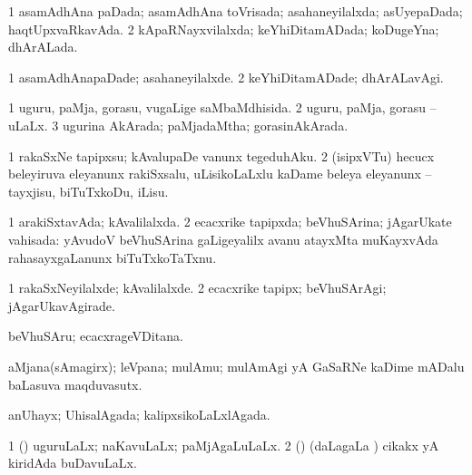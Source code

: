 \bentry
{} 
\gl{\gu}
\expl{}
\bmng
\bnum
\num{1} asamAdhAna paDada; asamAdhAna toVrisada; asahaneyilalxda; asUyepaDada; haqtUpxvaRkavAda. 
\num{2} kApaRNayxvilalxda; keYhiDitamADada; koDugeYna; dhArALada. 
\enum
\emng
\eentry

\bentry
{} 
\gl{\kirxvi}
\expl{}
\bmng
\bnum
\num{1} asamAdhAnapaDade; asahaneyilalxde. 
\num{2} keYhiDitamADade; dhArALavAgi. 
\enum
\emng
\eentry

\bentry
{} 
\gl{\gu}
\bmng
\bnum
\num{1} uguru, paMja, gorasu, \mo vugaLige saMbaMdhisida. 
\num{2} uguru, paMja, gorasu -- uLaLx. 
\num{3} ugurina AkArada; paMjadaMtha; gorasinAkArada. 
\enum
\emng
\eentry

\bentry
{} 
\gl{\sakirx}
\expl{}
\bmng
\bnum
\num{1} rakaSxNe tapipxsu; kAvalupaDe \mo vanunx tegeduhAku. 
\num{2} (isipxVTu) hecucx beleyiruva eleyanunx rakiSxsalu, uLisikoLaLxlu kaDame beleya eleyanunx -- tayxjisu, biTuTxkoDu, iLisu. 
\enum
\emng
\eentry

\bentry
{} 
\gl{\gu}
\expl{}
\bmng
\bnum
\num{1} arakiSxtavAda; kAvalilalxda. 
\num{2} ecacxrike tapipxda; beVhuSArina; jAgarUkate vahisada:  yAvudoV beVhuSArina gaLigeyalilx avanu atayxMta muKayxvAda rahasayxgaLanunx biTuTxkoTaTxnu. 
\enum
\emng
\eentry

\bentry
{} 
\gl{\kirxvi}
\expl{}
\bmng
\bnum
\num{1} rakaSxNeyilalxde; kAvalilalxde. 
\num{2} ecacxrike tapipx; beVhuSArAgi; jAgarUkavAgirade. 
\enum
\emng
\eentry

\bentry
{} 
\gl{\nA}
\expl{}
\bmng
 beVhuSAru; ecacxrageVDitana. 
\emng
\eentry

\bentry
{} 
\gl{\nA}
\expl{}
\bmng
 aMjana(sAmagirx); leVpana; mulAmu; mulAmAgi yA GaSaRNe kaDime mADalu baLasuva maqduvasutx. 
\emng
\eentry

\bentry
{} 
\gl{\gu}
\expl{}
\bmng
 anUhayx; UhisalAgada; kalipxsikoLaLxlAgada. 
\emng
\eentry



\bentry
{} 
\gl{\gu}
\expl{}
\bmng
\bnum
\num{1} (\pArxparx) uguruLaLx; naKavuLaLx; paMjAgaLuLaLx. 
\num{2} (\savi) (daLagaLa \vi) cikakx yA kiridAda buDavuLaLx. 
\enum
\emng
\eentry

